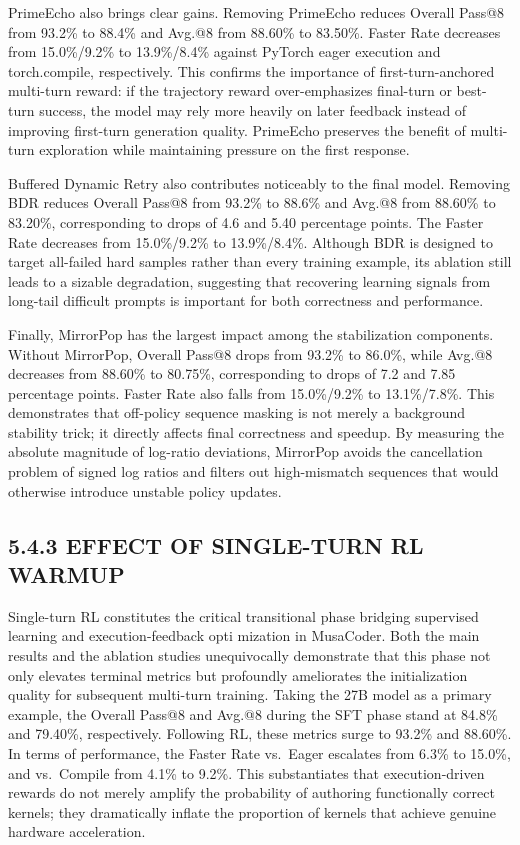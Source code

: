 \documentclass[
  10
]{article}
\begin{document}
PrimeEcho also brings clear gains. Removing PrimeEcho reduces Overall
Pass@8 from 93.2\% to 88.4\% and Avg.@8 from 88.60\% to 83.50\%. Faster
Rate decreases from 15.0\%/9.2\% to 13.9\%/8.4\% against PyTorch eager
execution and torch.compile, respectively. This confirms the importance
of first-turn-anchored multi-turn reward: if the trajectory reward
over-emphasizes final-turn or best-turn success, the model may rely more
heavily on later feedback instead of improving first-turn generation
quality. PrimeEcho preserves the benefit of multi-turn exploration while
maintaining pressure on the first response.

Buffered Dynamic Retry also contributes noticeably to the final model.
Removing BDR reduces Overall Pass@8 from 93.2\% to 88.6\% and Avg.@8
from 88.60\% to 83.20\%, corresponding to drops of 4.6 and 5.40
percentage points. The Faster Rate decreases from 15.0\%/9.2\% to
13.9\%/8.4\%. Although BDR is designed to target all-failed hard samples
rather than every training example, its ablation still leads to a
sizable degradation, suggesting that recovering learning signals from
long-tail difficult prompts is important for both correctness and
performance.

Finally, MirrorPop has the largest impact among the stabilization
components. Without MirrorPop, Overall Pass@8 drops from 93.2\% to
86.0\%, while Avg.@8 decreases from 88.60\% to 80.75\%, corresponding to
drops of 7.2 and 7.85 percentage points. Faster Rate also falls from
15.0\%/9.2\% to 13.1\%/7.8\%. This demonstrates that off-policy sequence
masking is not merely a background stability trick; it directly affects
final correctness and speedup. By measuring the absolute magnitude of
log-ratio deviations, MirrorPop avoids the cancellation problem of
signed log ratios and filters out high-mismatch sequences that would
otherwise introduce unstable policy updates.

\subsection{5.4.3 EFFECT OF SINGLE-TURN RL
WARMUP}\label{effect-of-single-turn-rl-warmup}

Single-turn RL constitutes the critical transitional phase bridging
supervised learning and execution-feedback opti mization in MusaCoder.
Both the main results and the ablation studies unequivocally demonstrate
that this phase not only elevates terminal metrics but profoundly
ameliorates the initialization quality for subsequent multi-turn
training. Taking the 27B model as a primary example, the Overall Pass@8
and Avg.@8 during the SFT phase stand at 84.8\% and 79.40\%,
respectively. Following RL, these metrics surge to 93.2\% and 88.60\%.
In terms of performance, the Faster Rate vs.~Eager escalates from 6.3\%
to 15.0\%, and vs.~Compile from 4.1\% to 9.2\%. This substantiates that
execution-driven rewards do not merely amplify the probability of
authoring functionally correct kernels; they dramatically inflate the
proportion of kernels that achieve genuine hardware acceleration.
\end{document}

